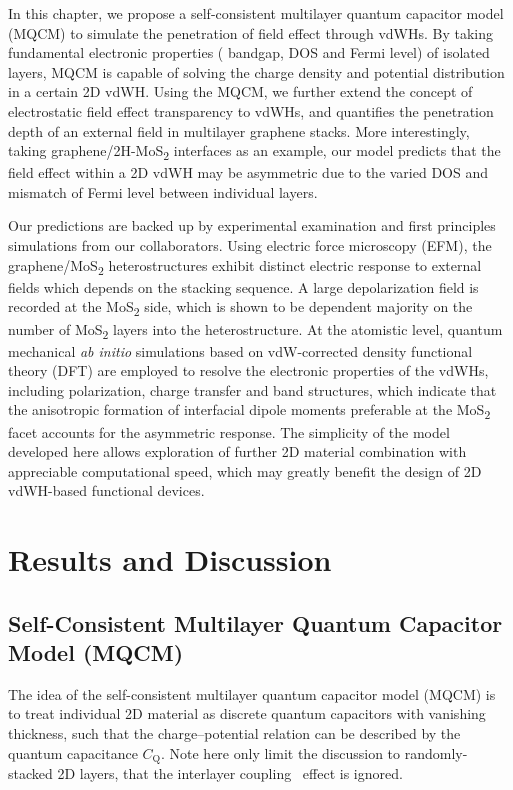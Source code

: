 In this chapter, we propose a self-consistent multilayer quantum
capacitor model (MQCM) to simulate the penetration of field effect
through vdWHs. By taking fundamental electronic properties (\eg
bandgap, DOS and Fermi level) of isolated layers, MQCM is capable of
solving the charge density and potential distribution in a certain 2D
vdWH.
%
Using the MQCM, we further extend the concept of electrostatic field
effect transparency to vdWHs, and quantifies the penetration depth of
an external field in multilayer graphene stacks.
%
More interestingly, taking graphene/2H-MoS\textsubscript{2} interfaces
as an example, our model predicts that the field effect within a 2D
vdWH may be asymmetric due to the varied DOS and mismatch of
Fermi level between individual layers.
%

Our predictions are backed up by experimental examination and first
principles simulations from our collaborators.
%
Using electric force microscopy (EFM), the
graphene/MoS\textsubscript{2} heterostructures exhibit distinct
electric response to external fields which depends on the stacking
sequence.
%
A large depolarization field is recorded at the
MoS\textsubscript{2} side, which is shown to be dependent majority
on the number of MoS\textsubscript{2} layers into the
heterostructure.
%
At the atomistic level, quantum mechanical \textit{ab initio}
simulations based on vdW-corrected density functional theory (DFT) are
employed to resolve the electronic properties of the vdWHs, including
polarization, charge transfer and band structures,
%
which indicate that
the anisotropic formation of interfacial dipole moments preferable at
the MoS\textsubscript{2} facet accounts for the asymmetric
response.
%
The simplicity of the model developed here allows exploration of
further 2D material combination with appreciable computational speed,
which may greatly benefit the design of 2D vdWH-based functional
devices.

\section{Results and Discussion}
\label{sec:asym-results}


\subsection{Self-Consistent Multilayer Quantum Capacitor Model (MQCM)}
\label{sec:asym-model}

The idea of the self-consistent multilayer quantum capacitor model
(MQCM) is to treat individual 2D material as discrete quantum
capacitors with vanishing thickness, such that the charge--potential
relation can be described by the quantum capacitance $C_{\mathrm{Q}}$.
%
Note here only limit the discussion to randomly-stacked 2D layers,
that the interlayer coupling~\autocite{Fang_2014_intercoupl_vdW} effect is
ignored.

